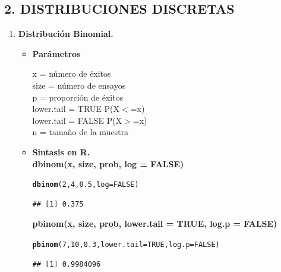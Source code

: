 \documentclass[12pt,letterpaper]{article}\usepackage[]{graphicx}\usepackage[]{color}
\makeatletter
\newcommand{\hlnum}[1]{\textcolor[rgb]{0.686,0.059,0.569}{#1}}%
\newcommand{\hlstd}[1]{\textcolor[rgb]{0.345,0.345,0.345}{#1}}%
\newcommand{\hlkwc}[1]{\textcolor[rgb]{0.333,0.667,0.333}{#1}}%
\newcommand{\hlkwd}[1]{\textcolor[rgb]{0.737,0.353,0.396}{\textbf{#1}}}%
\newenvironment{kframe}{%
 \def\at@end@of@kframe{}%
 \ifinner\ifhmode%
  \def\at@end@of@kframe{\end{minipage}}%
  \begin{minipage}{\columnwidth}%
 \fi\fi%
 \def\FrameCommand##1{\hskip\@totalleftmargin \hskip-\fboxsep
 \colorbox{shadecolor}{##1}\hskip-\fboxsep
     \hskip-\linewidth \hskip-\@totalleftmargin \hskip\columnwidth}%
 \MakeFramed {\advance\hsize-\width
   \@totalleftmargin\z@ \linewidth\hsize
   \@setminipage}}%
 {\par\unskip\endMakeFramed%
 \at@end@of@kframe}
\newenvironment{knitrout}{}{} %
\makeatother
\begin{document}
\newpage
\begin{center}
\subsection*{2. DISTRIBUCIONES DISCRETAS}
\end{center}

\begin{enumerate}
\item \textbf{Distribuci\'on Binomial.}

\begin{itemize}
\item \textbf{Par\'ametros}
\begin{center}
x = n\'umero de \'exitos\\
size = n\'umero de ensayos\\ 
p = proporci\'on de \'exitos\\
lower.tail = TRUE P(X$<$=x)\\
lower.tail = FALSE P(X$>$=x)\\ 
n = tama\~no de la muestra 
\end{center}
  
\item \textbf{Sintasis en R.}\\

\textbf{dbinom(x, size, prob, log = FALSE)}
\begin{knitrout}
\color{fgcolor}\begin{kframe}
\begin{alltt}
\hlkwd{dbinom}\hlstd{(}\hlnum{2}\hlstd{,} \hlnum{4}\hlstd{,} \hlnum{0.5}\hlstd{,} \hlkwc{log} \hlstd{=} \hlnum{FALSE}\hlstd{)}
\end{alltt}
\begin{verbatim}
## [1] 0.375
\end{verbatim}
\end{kframe}
\end{knitrout}

\textbf{pbinom(x, size, prob, lower.tail = TRUE, log.p = FALSE)}
\begin{knitrout}
\color{fgcolor}\begin{kframe}
\begin{alltt}
\hlkwd{pbinom}\hlstd{(}\hlnum{7}\hlstd{,} \hlnum{10}\hlstd{,} \hlnum{0.3}\hlstd{,} \hlkwc{lower.tail} \hlstd{=} \hlnum{TRUE}\hlstd{,} \hlkwc{log.p} \hlstd{=} \hlnum{FALSE}\hlstd{)}
\end{alltt}
\begin{verbatim}
## [1] 0.9984096
\end{verbatim}
\end{kframe}
\end{knitrout}


\end{itemize}
\end{enumerate}
\end{document}
